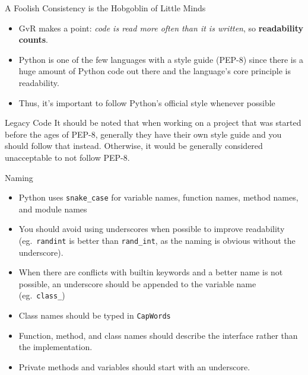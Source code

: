 \documentclass{lug}
\begin{document}
\begin{frame}{A Foolish Consistency is the Hobgoblin of Little Minds}
    \begin{itemize}[<+->]
        \item GvR makes a point: \emph{code is read more often than it is
            written}, so \textbf{readability counts}.
        \item Python is one of the few languages with a style guide (PEP-8)
            since there is a huge amount of Python code out there and the
            language's core principle is readability.
        \item Thus, it's important to follow Python's official style whenever
            possible
    \end{itemize}
    \pause[\thebeamerpauses]
    \begin{block}{Legacy Code}
        \small
        It should be noted that when working on a project that was started
        before the ages of PEP-8, generally they have their own style guide and
        you should follow that instead.  Otherwise, it would be generally
        considered unacceptable to not follow PEP-8.
    \end{block}
\end{frame}

\begin{frame}{Naming}
    \begin{itemize}[<+->]
        \item Python uses \texttt{snake\_case} for variable names, function
            names, method names, and module names
        \item You should avoid using underscores when possible to improve
            readability (eg.\ \texttt{randint} is better than
            \texttt{rand\_int}, as the naming is obvious without the
            underscore).
        \item When there are conflicts with builtin keywords and a better name
            is not possible, an underscore should be appended to the variable
            name (eg.\ \texttt{class\_})
        \item Class names should be typed in \texttt{CapWords}
        \item Function, method, and class names should describe the
            interface rather than the implementation.
        \item Private methods and variables should start with an underscore.
    \end{itemize}
\end{frame}
\end{document}
